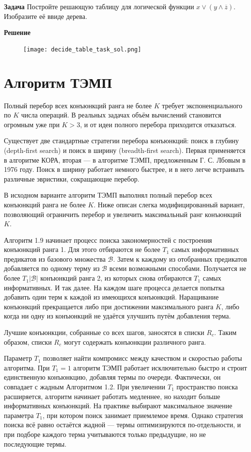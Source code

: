 \textbf{Задача}
Постройте решающую таблицу для логической функции $x \vee (y \wedge \overline{z}).$ Изобразите её ввиде дерева.

\textbf{Решение}
\begin{figure}
    \centering
    \texttt{[image: decide\_table\_task\_sol.png]}
\end{figure}

\section{Алгоритм ТЭМП}

Полный перебор всех конъюнкций ранга не более $K$ требует экспоненциального по $K$ числа операций. В реальных задачах объём вычислений становится огромным уже при $K > 3$, и от идеи полного перебора приходится отказаться.

Существует две стандартные стратегии перебора конъюнкций: поиск в глубину (depth-first search) и поиск в ширину (breadth-first search). Первая применяется в алгоритме КОРА, вторая — в алгоритме ТЭМП, предложенным Г. С. Лбовым в 1976 году. Поиск в ширину работает немного быстрее, и в него легче встраивать различные эвристики, сокращающие перебор.

В исходном варианте алгоритм ТЭМП выполнял полный перебор всех конъюнкций ранга не более $K$. Ниже описан слегка модифицированный вариант, позволяющий ограничить перебор и увеличить максимальный ранг конъюнкций $K$.

Алгоритм 1.9 начинает процесс поиска закономерностей с построения конъюнкций ранга 1. Для этого отбираются не более $T_1$ самых информативных предикатов из базового множества $\mathcal{B}$. Затем к каждому из отобранных предикатов добавляется по одному терму из $\mathcal{B}$ всеми возможными способами. Получается не более $T_1|\mathcal{B}|$ конъюнкций ранга 2, из которых снова отбираются $T_1$ самых информативных. И так далее. На каждом шаге процесса делается попытка добавить один терм к каждой из имеющихся конъюнкций. Наращивание конъюнкций прекращается либо при достижении максимального ранга $K$, либо когда ни одну из конъюнкций не удаётся улучшить путём добавления терма.

Лучшие конъюнкции, собранные со всех шагов, заносятся в списки $R_c$. Таким образом, списки $R_c$ могут содержать конъюнкции различного ранга.

Параметр $T_1$ позволяет найти компромисс между качеством и скоростью работы алгоритма. При $T_1 = 1$ алгоритм ТЭМП работает исключительно быстро и строит единственную конъюнкцию, добавляя термы по очереди. Фактически, он совпадает с жадным Алгоритмом 1.2. При увеличении $T_1$ пространство поиска расширяется, алгоритм начинает работать медленнее, но находит больше информативных конъюнкций. На практике выбирают максимальное значение параметра $T_1$, при котором поиск занимает приемлемое время. Однако стратегия поиска всё равно остаётся жадной — термы оптимизируются по-отдельности, и при подборе каждого терма учитываются только предыдущие, но не последующие термы.

